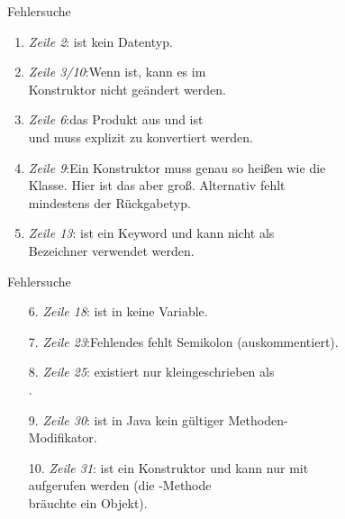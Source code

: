 \SidebarSolution
\begin{frame}[c]{Fehlersuche}
   \begin{enumerate}[<+(1)->]
      \itemsep9.25pt
      \item \textit{Zeile 2}:\quad {} ist kein Datentyp.
      \item \textit{Zeile 3/10}:\quad Wenn   ist, kann es im\\\qquad Konstruktor nicht geändert werden.
      \item \textit{Zeile 6}:\quad das Produkt aus  und  ist \\\qquad und muss explizit zu  konvertiert werden.
      \item \textit{Zeile 9}:\quad Ein Konstruktor muss genau so heißen wie die\\\qquad Klasse. Hier ist das  aber groß. Alternativ fehlt\\\qquad mindestens der Rückgabetyp.
      \item \textit{Zeile 13}:\quad {} ist ein Keyword und kann nicht als\\\qquad Bezeichner verwendet werden.
   \end{enumerate}
\end{frame}

\begin{frame}[c]{Fehlersuche}
   \begin{enumerate}[<+(1)->]
      \itemsep9.25pt
      \item[6.] \textit{Zeile 18}:\quad {} ist in  keine Variable.
      \item[7.] \textit{Zeile 23}:\quad Fehlendes fehlt Semikolon (auskommentiert).
      \item[8.] \textit{Zeile 25}:\quad {} existiert nur kleingeschrieben als\\\qquad{}.
      \item[9.] \textit{Zeile 30}:\quad {} ist in Java kein gültiger Methoden-\\\qquad Modifikator.
      \item[10.] \textit{Zeile 31}:\quad {} ist ein Konstruktor und kann nur mit\\\qquad{} aufgerufen werden (die -Methode\\\qquad bräuchte ein Objekt).
   \end{enumerate}
\end{frame}
\SidebarReset

